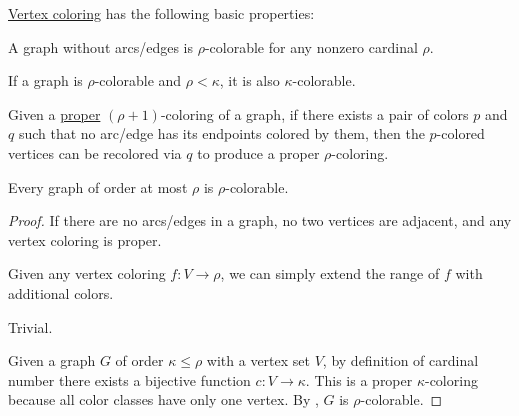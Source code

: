 \begin{proposition}\label{thm:def:graph_coloring}
  \hyperref[def:multipartite_graph]{Vertex coloring} has the following basic properties:
  \begin{thmenum}
     A graph without arcs/edges is \( \rho \)-colorable for any nonzero cardinal \( \rho \).

     If a graph is \( \rho \)-colorable and \( \rho < \kappa \), it is also \( \kappa \)-colorable.

     Given a \hyperref[def:graph_coloring/proper]{proper} \( (\rho + 1) \)-coloring of a graph, if there exists a pair of colors \( p \) and \( q \) such that no arc/edge has its endpoints colored by them, then the \( p \)-colored vertices can be recolored via \( q \) to produce a proper \( \rho \)-coloring.

     Every graph of order at most \( \rho \) is \( \rho \)-colorable.
  \end{thmenum}
\end{proposition}
\begin{proof}
   If there are no arcs/edges in a graph, no two vertices are adjacent, and any vertex coloring is proper.

   Given any vertex coloring \( f: V \to \rho \), we can simply extend the range of \( f \) with additional colors.

   Trivial.

   Given a graph \( G \) of order \( \kappa \leq \rho \) with a vertex set \( V \), by definition of cardinal number there exists a bijective function \( c: V \to \kappa \). This is a proper \( \kappa \)-coloring because all color classes have only one vertex. By , \( G \) is \( \rho \)-colorable.
\end{proof}

